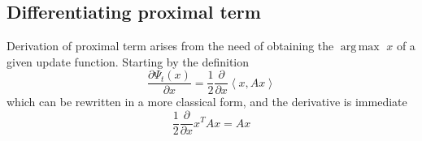 \documentclass[notitlepage]{article}
\DeclareMathOperator*{\argmax}{arg\,max}
\begin{document}
\subsection{Differentiating proximal term}
Derivation of proximal term arises from the need of obtaining the $\argmax$ $x$ of a given update function. Starting by the definition
\[
  \frac{\partial \Psi_t(x)}{\partial x} = \frac{1}{2} \frac{\partial}{\partial x} \left\langle x, A x \right\rangle  
\]
which can be rewritten in a more classical form, and the derivative is immediate
\[
  \frac{1}{2} \frac{\partial}{\partial x} x^T A x = A x
\]
\end{document}
